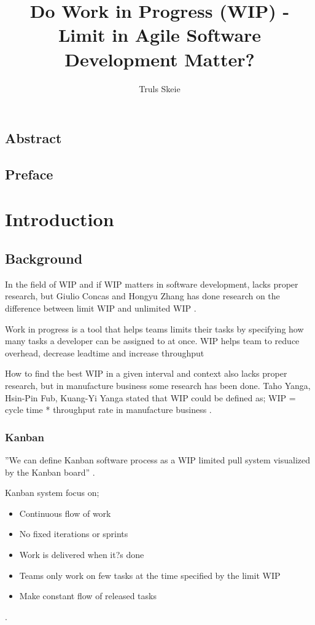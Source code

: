 \documentclass[UKenglish]{ifimaster}  %
\title{Do Work in Progress (WIP) - Limit in Agile Software Development Matter?}        %
\author{Truls Skeie}                      %
\begin{document}
\ififorside{}
\frontmatter{}
\maketitle{}

\chapter*{Abstract}                   %

\tableofcontents{}
\listoffigures{}
\listoftables{}

\chapter*{Preface}                    %

\mainmatter{}
\part{Introduction}                   %


\chapter{Background}                  %
In the field of WIP and if WIP matters in software development, lacks proper research, but Giulio Concas and Hongyu Zhang has done research on the difference between limit WIP and unlimited WIP  \parencite{SMR:SMR1599}.

Work in progress is a tool that helps teams limits their tasks by specifying how many tasks a developer can be assigned to at once. WIP helps team to reduce overhead, decrease leadtime and increase throughput %

How to find the best WIP in a given interval and context also lacks proper research, but in manufacture business some research has been done. Taho Yanga, Hsin-Pin Fub, Kuang-Yi Yanga stated that WIP could be defined as; WIP = cycle time * throughput rate in manufacture business \parencite{Yang}.

\section{Kanban}
''We can define Kanban software process as a WIP limited pull system visualized by the Kanban board''  \parencite{DavidAnderson}.

Kanban system focus on;
\begin{itemize}
\item Continuous flow of work
\item	No fixed iterations or sprints
\item Work is delivered when it?s done
\item Teams only work on few tasks at the time specified by the limit WIP
\item Make constant flow of released tasks
\end{itemize}
\parencite{DavidAnderson}.
\end{document}
